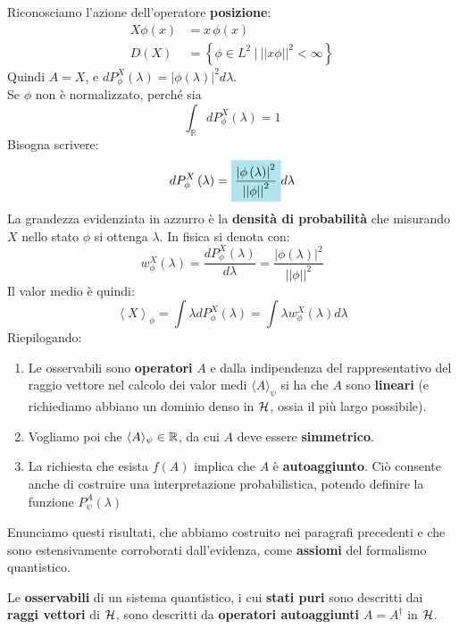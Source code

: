 \documentclass[../../FisicaTeorica.tex]{subfiles}
\begin{document}
Riconosciamo l'azione dell'operatore \textbf{posizione}:
\begin{align*}
    X\phi \left(x\right)&=x\,\phi \left(x\right)\\
    D\left(X\right)&=\left\{\phi\in L^2\ |\ \left|\left|x\phi\right|\right|^2<\infty\right\}
\end{align*}
Quindi $A=X$, e $dP_\phi^X(\lambda) = |\phi(\lambda)|^2 d\lambda$.\\
Se $\phi$  non è normalizzato, perché sia \[ \int_{\mathbb{R}}{dP_\phi^X\left(\lambda\right)}=1 \]
Bisogna scrivere:
\[
dP_\phi^X\left(\lambda\right)=\hlc{SkyBlue}{\frac{\left|\phi\left(\lambda\right)\right|^2}{\left|\left|\phi\right|\right|^2}}d\lambda 
\]
La grandezza evidenziata in azzurro è la \textbf{densità di probabilità} che misurando $X$ nello stato $\phi$ si ottenga $\lambda$. In fisica si denota con:
\[
w_\phi^X\left(\lambda\right)=\frac{dP_\phi^X\left(\lambda\right)}{d\lambda}=\frac{\left|\phi\left(\lambda\right)\right|^2}{\left|\left|\phi\right|\right|^2}
\]
Il valor medio è quindi:
\[
\left\langle X\right\rangle_\phi=\int \lambda  dP_\phi^X\left(\lambda\right)=\int \lambda  w_\phi^X\left(\lambda\right) d\lambda 
\]
Riepilogando: 
\begin{enumerate}
    \item Le osservabili sono \textbf{operatori} $A$ e dalla indipendenza del rappresentativo del raggio vettore nel calcolo dei valor medi $\langle A\rangle_\psi$ si ha che $A$ sono \textbf{lineari} (e richiediamo abbiano un dominio denso in $\mathcal{H}$, ossia il più largo possibile).
    \item Vogliamo poi che $\langle A \rangle_\psi \in \mathbb{R}$, da cui $A$ deve essere \textbf{simmetrico}.
    \item La richiesta che esista $f\left(A\right)$ implica che $A$ è \textbf{autoaggiunto}.  Ciò consente anche di costruire una interpretazione probabilistica, potendo definire la funzione $P_\psi^A\left(\lambda\right)$
\end{enumerate}
Enunciamo questi risultati, che abbiamo costruito nei paragrafi precedenti e che sono estensivamente corroborati dall'evidenza, come \textbf{assiomi} del formalismo quantistico.
\begin{axi}
Le \textbf{osservabili} di un sistema quantistico, i cui \textbf{stati puri} sono descritti dai \textbf{raggi vettori} di $\mathcal{H}$, sono descritti da \textbf{operatori autoaggiunti} $A=A^\dag$ in $\mathcal{H}$.
\end{axi}
\end{document}
